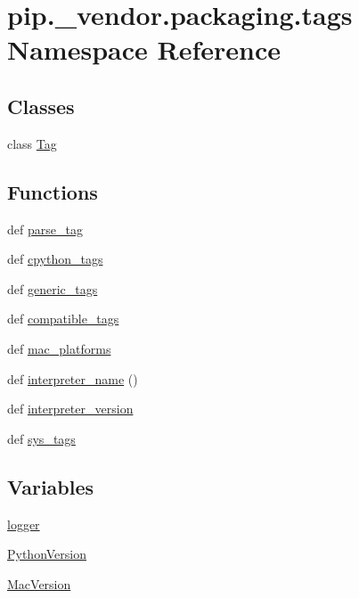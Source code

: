 \hypertarget{namespacepip_1_1__vendor_1_1packaging_1_1tags}{}\section{pip.\+\_\+vendor.\+packaging.\+tags Namespace Reference}
\label{namespacepip_1_1__vendor_1_1packaging_1_1tags}
\subsection*{Classes}
\begin{DoxyCompactItemize}
\item 
class \hyperlink{classpip_1_1__vendor_1_1packaging_1_1tags_1_1Tag}{Tag}
\end{DoxyCompactItemize}
\subsection*{Functions}
\begin{DoxyCompactItemize}
\item 
def \hyperlink{namespacepip_1_1__vendor_1_1packaging_1_1tags_a0f2472500ec9b9cfc6f35792e99afe14}{parse\+\_\+tag}
\item 
def \hyperlink{namespacepip_1_1__vendor_1_1packaging_1_1tags_a759a895011d7ff24a84f300c46ed7763}{cpython\+\_\+tags}
\item 
def \hyperlink{namespacepip_1_1__vendor_1_1packaging_1_1tags_a3ff2720d92e196b4ad45b6cf74ae521a}{generic\+\_\+tags}
\item 
def \hyperlink{namespacepip_1_1__vendor_1_1packaging_1_1tags_a3a62384b925e634cd12d512e0c789c3e}{compatible\+\_\+tags}
\item 
def \hyperlink{namespacepip_1_1__vendor_1_1packaging_1_1tags_ab5e9bba821dadbf9c4b1d1227994a6be}{mac\+\_\+platforms}
\item 
def \hyperlink{namespacepip_1_1__vendor_1_1packaging_1_1tags_ac61b060acc6cd20bcbf8ccd0efff665d}{interpreter\+\_\+name} ()
\item 
def \hyperlink{namespacepip_1_1__vendor_1_1packaging_1_1tags_a91b8ad9c2a1377d200207952f73a0854}{interpreter\+\_\+version}
\item 
def \hyperlink{namespacepip_1_1__vendor_1_1packaging_1_1tags_a416071e17e14ebc28dd0ce07867ce07b}{sys\+\_\+tags}
\end{DoxyCompactItemize}
\subsection*{Variables}
\begin{DoxyCompactItemize}
\item 
\hyperlink{namespacepip_1_1__vendor_1_1packaging_1_1tags_a5f40ea79d0df10ad1695414a7834a60c}{logger}
\item 
\hyperlink{namespacepip_1_1__vendor_1_1packaging_1_1tags_a7ece6d29b4e242dd4f2aa81b755ccee2}{Python\+Version}
\item 
\hyperlink{namespacepip_1_1__vendor_1_1packaging_1_1tags_a7612b6784b6253e387d39de8dfdffbeb}{Mac\+Version}
\end{DoxyCompactItemize}


